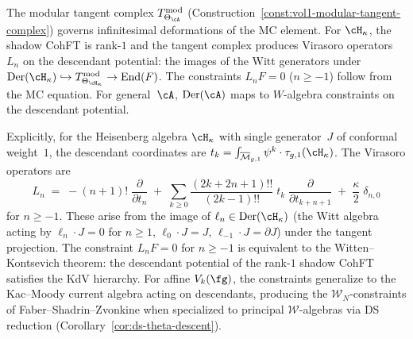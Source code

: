 \begin{remark}
\label{rem:virasoro-constraints-tangent-complex}
The modular tangent complex $T^{\mathrm{mod}}_{\Theta_\cA}$
(Construction~\ref{const:vol1-modular-tangent-complex})
governs infinitesimal deformations of the MC element.  For
$\cH_\kappa$, the shadow CohFT is
rank-$1$ and the tangent complex produces Virasoro operators
$L_n$ on the descendant potential: the images of the Witt generators under
$\operatorname{Der}(\cH_\kappa) \hookrightarrow
T^{\mathrm{mod}}_{\Theta_{\cH_\kappa}}
\to \operatorname{End}(F)$.
The constraints $L_n F = 0$ ($n \geq -1$) follow from the MC equation.
For general~$\cA$, $\operatorname{Der}(\cA)$ maps to
$W$-algebra constraints on the descendant potential.

Explicitly, for the Heisenberg algebra $\cH_\kappa$ with single
generator~$J$ of conformal weight~$1$, the descendant coordinates are
$t_k = \int_{\overline{\mathcal{M}}_{g,1}} \psi^k \cdot
\tau_{g,1}(\cH_\kappa)$.  The Virasoro operators are
\begin{equation}\label{eq:virasoro-operators-heisenberg}
L_n
\;=\;
-(n+1)!\;\frac{\partial}{\partial t_n}
\;+\;
\sum_{k \geq 0}
\frac{(2k+2n+1)!!}{(2k-1)!!}
\;t_k\;\frac{\partial}{\partial t_{k+n+1}}
\;+\;
\frac{\kappa}{2}\;\delta_{n,0}
\end{equation}
for $n \geq -1$.  These arise from the image of
$\ell_n \in \operatorname{Der}(\cH_\kappa)$
(the Witt algebra acting by $\ell_n \cdot J = 0$ for $n \geq 1$,
$\ell_0 \cdot J = J$, $\ell_{-1} \cdot J = \partial J$) under the
tangent projection.  The constraint $L_n F = 0$ for $n \geq -1$ is
equivalent to the Witten--Kontsevich theorem: the descendant potential
of the rank-$1$ shadow CohFT satisfies the KdV hierarchy.  For
affine $V_k(\fg)$, the constraints generalize to the Kac--Moody
current algebra acting on descendants, producing the
$\mathcal{W}_N$-constraints of Faber--Shadrin--Zvonkine when
specialized to principal $\mathcal{W}$-algebras via DS reduction
(Corollary~\ref{cor:ds-theta-descent}).
\end{remark}

